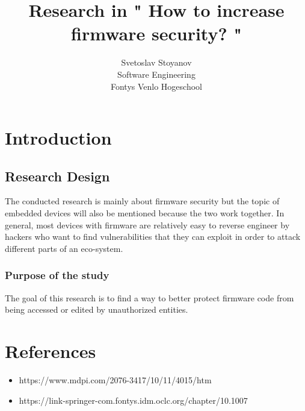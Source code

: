 \documentclass[]{report}
\title{Research in " How to increase firmware security? " }
\author{Svetoslav Stoyanov \\
	Software Engineering \\
	Fontys Venlo Hogeschool}
\begin{document}

\maketitle
\tableofcontents
\chapter{Introduction}
\section{Research Design} 
The conducted research is mainly about firmware security but the topic of embedded devices will also be mentioned because the two work together. In general, most devices with firmware are relatively easy to reverse engineer by hackers who want to find vulnerabilities that they can exploit in order to attack different parts of an eco-system.


\subsection{Purpose of the study} 
The goal of this research is to find a way to better protect firmware code from being accessed or edited by unauthorized entities.
\chapter{References}
\begin{itemize}
	\item https://www.mdpi.com/2076-3417/10/11/4015/htm
	\item https://link-springer-com.fontys.idm.oclc.org/chapter/10.1007%
\end{itemize}
\end{document}
